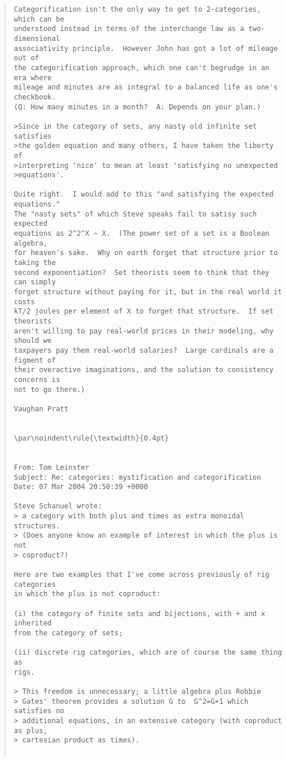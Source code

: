 \begin{quote}
\begin{verbatim}
Categorification isn't the only way to get to 2-categories, which can be
understood instead in terms of the interchange law as a two-dimensional
associativity principle.  However John has got a lot of mileage out of
the categorification approach, which one can't begrudge in an era where
mileage and minutes are as integral to a balanced life as one's checkbook.
(Q: How many minutes in a month?  A: Depends on your plan.)

>Since in the category of sets, any nasty old infinite set satisfies
>the golden equation and many others, I have taken the liberty of
>interpreting 'nice' to mean at least 'satisfying no unexpected
>equations'.

Quite right.  I would add to this "and satisfying the expected equations."
The "nasty sets" of which Steve speaks fail to satisy such expected
equations as 2^2^X ~ X.  (The power set of a set is a Boolean algebra,
for heaven's sake.  Why on earth forget that structure prior to taking the
second exponentiation?  Set theorists seem to think that they can simply
forget structure without paying for it, but in the real world it costs
kT/2 joules per element of X to forget that structure.  If set theorists
aren't willing to pay real-world prices in their modeling, why should we
taxpayers pay them real-world salaries?  Large cardinals are a figment of
their overactive imaginations, and the solution to consistency concerns is
not to go there.)

Vaughan Pratt


\par\noindent\rule{\textwidth}{0.4pt}


From: Tom Leinster 
Subject: Re: categories: mystification and categorification
Date: 07 Mar 2004 20:50:39 +0000

Steve Schanuel wrote:
> a category with both plus and times as extra monoidal structures.
> (Does anyone know an example of interest in which the plus is not
> coproduct?) 

Here are two examples that I've come across previously of rig categories
in which the plus is not coproduct:

(i) the category of finite sets and bijections, with + and x inherited
from the category of sets;

(ii) discrete rig categories, which are of course the same thing as
rigs.

> This freedom is unnecessary; a little algebra plus Robbie
> Gates' theorem provides a solution G to  G^2=G+1 which satisfies no
> additional equations, in an extensive category (with coproduct as plus,
> cartesian product as times).


\end{verbatim}
\end{quote}
